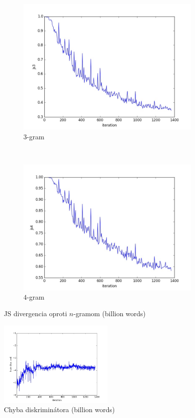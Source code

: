 \documentclass[10pt,a4paper]{article}
\begin{document}
\begin{figure}[H]
    \begin{subfigure}[b]{0.4\textwidth}
        \includegraphics[width=\textwidth]{cuted/js3}
        \caption{$3$-gram}
    \end{subfigure}
    ~ 
    \begin{subfigure}[b]{0.4\textwidth}
        \includegraphics[width=\textwidth]{cuted/js4}
        \caption{$4$-gram}
    \end{subfigure}
    \caption{JS divergencia oproti $n$-gramom (billion words)}\label{fig:animals}
\end{figure}
\begin{figure}[H]
	\centering
	\includegraphics[width=0.5\textwidth]{cuted/train_disc_cost}
    \caption{Chyba diskriminátora (billion words) }
\end{figure}
\end{document}
